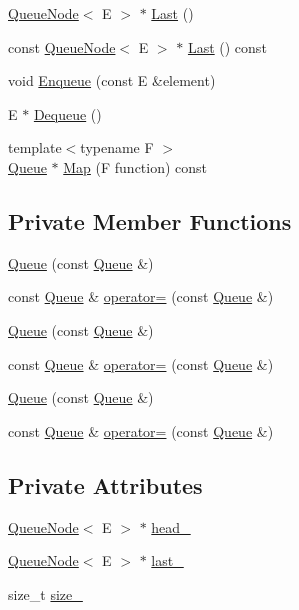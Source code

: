 \begin{DoxyCompactItemize}
\item 
\mbox{\hyperlink{class_queue_node}{Queue\+Node}}$<$ E $>$ $\ast$ \mbox{\hyperlink{class_queue_a430aca3d3b9f5fd588b215028d134b74}{Last}} ()
\item 
const \mbox{\hyperlink{class_queue_node}{Queue\+Node}}$<$ E $>$ $\ast$ \mbox{\hyperlink{class_queue_a7c8c2c64700dfe1df8bf266572cf101a}{Last}} () const
\item 
void \mbox{\hyperlink{class_queue_abaa2e7175457307bca74f5562cbdaaa9}{Enqueue}} (const E \&element)
\item 
E $\ast$ \mbox{\hyperlink{class_queue_a434d465001c3078e999f7a89a8af84c0}{Dequeue}} ()
\item 
{\footnotesize template$<$typename F $>$ }\\\mbox{\hyperlink{class_queue}{Queue}} $\ast$ \mbox{\hyperlink{class_queue_a904a696292fc593adc6fd21fb229d760}{Map}} (F function) const
\end{DoxyCompactItemize}
\subsection*{Private Member Functions}
\begin{DoxyCompactItemize}
\item 
\mbox{\hyperlink{class_queue_ac071ee553005a67737d35edeeaafca5b}{Queue}} (const \mbox{\hyperlink{class_queue}{Queue}} \&)
\item 
const \mbox{\hyperlink{class_queue}{Queue}} \& \mbox{\hyperlink{class_queue_adf6f3eb046365f1b67b6c0bd5da2da59}{operator=}} (const \mbox{\hyperlink{class_queue}{Queue}} \&)
\item 
\mbox{\hyperlink{class_queue_ac071ee553005a67737d35edeeaafca5b}{Queue}} (const \mbox{\hyperlink{class_queue}{Queue}} \&)
\item 
const \mbox{\hyperlink{class_queue}{Queue}} \& \mbox{\hyperlink{class_queue_adf6f3eb046365f1b67b6c0bd5da2da59}{operator=}} (const \mbox{\hyperlink{class_queue}{Queue}} \&)
\item 
\mbox{\hyperlink{class_queue_ac071ee553005a67737d35edeeaafca5b}{Queue}} (const \mbox{\hyperlink{class_queue}{Queue}} \&)
\item 
const \mbox{\hyperlink{class_queue}{Queue}} \& \mbox{\hyperlink{class_queue_adf6f3eb046365f1b67b6c0bd5da2da59}{operator=}} (const \mbox{\hyperlink{class_queue}{Queue}} \&)
\end{DoxyCompactItemize}
\subsection*{Private Attributes}
\begin{DoxyCompactItemize}
\item 
\mbox{\hyperlink{class_queue_node}{Queue\+Node}}$<$ E $>$ $\ast$ \mbox{\hyperlink{class_queue_a127fe95586d81eb2473b1e5d5680c6e5}{head\+\_\+}}
\item 
\mbox{\hyperlink{class_queue_node}{Queue\+Node}}$<$ E $>$ $\ast$ \mbox{\hyperlink{class_queue_aaabf93e5ccdac6c4ae4568ae81081346}{last\+\_\+}}
\item 
size\+\_\+t \mbox{\hyperlink{class_queue_a7ac3c0717d894e1aecc56f4ddb35c7ea}{size\+\_\+}}
\end{DoxyCompactItemize}


